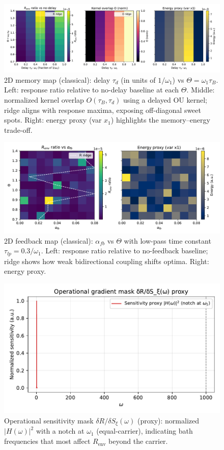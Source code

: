 \documentclass[11pt,letterpaper]{article}
\begin{document}
\begin{figure}[t]
\centering
\includegraphics[width=0.95\linewidth]{figK_memory_2d.pdf}
\caption{2D memory map (classical): delay $\tau_d$ (in units of $1/\omega_1$) vs $\Theta=\omega_1\tau_B$. Left: response ratio relative to no-delay baseline at each $\Theta$. Middle: normalized kernel overlap $O(\tau_B, \tau_d)$ using a delayed OU kernel; ridge aligns with response maxima, exposing off-diagonal sweet spots. Right: energy proxy (var $x_1$) highlights the memory--energy trade-off.}
\end{figure}

\begin{figure}[t]
\centering
\includegraphics[width=0.9\linewidth]{figL_feedback_2d.pdf}
\caption{2D feedback map (classical): $\alpha_{fb}$ vs $\Theta$ with low-pass time constant $\tau_{lp}=0.3/\omega_1$. Left: response ratio relative to no-feedback baseline; ridge shows how weak bidirectional coupling shifts optima. Right: energy proxy.}
\end{figure}

\begin{figure}[t]
\centering
\includegraphics[width=0.7\linewidth]{figM_sensitivity.pdf}
\caption{Operational sensitivity mask $\delta R/\delta S_\xi(\omega)$ (proxy): normalized $|H(\omega)|^2$ with a notch at $\omega_1$ (equal-carrier), indicating bath frequencies that most affect $R_{\mathrm{env}}$ beyond the carrier.}
\end{figure}
\end{document}
